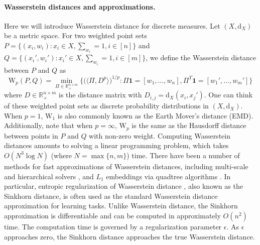 \documentclass[12pt]{article}
\newcommand{\R}{\mathbb R}
\begin{document}
\paragraph{Wasserstein distances and approximations.}
Here we will introduce Wasserstein distance for discrete measures. Let $(X, \mathrm{d}_X)$ be a metric space. 
For two weighted point sets $P = \{(x_i, w_i) : x_i \in X, \sum_{w_i} = 1, i \in [n]\}$ and $Q = \{(x_i', w_i'): x_i' \in X, \sum_{w_i} = 1, i \in [m]\}$, we define the Wasserstein distance between $P$ and $Q$ as 
\begin{equation*}
    \mathrm{W}_p(P, Q) = \min_{\Pi \in \R_+^{n \times m}} \Big\{\Big(\langle \Pi, D^p\rangle\Big)^{1/p} : \Pi \mathbf{1} = [w_1, \dots, w_n], \Pi^T \mathbf{1} = [w_1', \dots, w_m'] \Big\}
\end{equation*}
where $D \in \R_{+}^{n \times m}$ is the distance matrix with $D_{i, j} = \mathrm{d}_X(x_i, x_j')$.
One can think of these weighted point sets as discrete probability distributions in $(X, \mathrm{d}_X)$.
When $p = 1$, $\mathrm{W}_1$ is also commonly known as the Earth Mover's distance (EMD). 
Additionally, note that when $p = \infty$, $\mathrm{W}_p$ is the same as the Hausdorff distance between points in $P$ and $Q$ with non-zero weight. 
Computing Wasserstein distances amounts to solving a linear programming problem, which takes $O(N^3 \log N)$ (where $N = \max\{n, m\}$) time. 
There have been a number of methods for fast approximations of Wasserstein distances, including  multi-scale and hierarchical solvers \citep{schmitzer2016sparse}, and $L_1$ embeddings via quadtree algorithms \citep{backurs2020scalable, IndykThaper2003}. In particular, entropic regularization of Wasserstein distance \citep{cuturi2013sinkhorn}, also known as the Sinkhorn distance, is often used as the standard Wasserstein distance approximation for learning tasks. Unlike Wasserstein distance, the Sinkhorn approximation is differentiable and can be computed in approximately $O(n^2)$ time. 
The computation time is governed by a regularization parameter $\epsilon$. 
As $\epsilon$ approaches zero, the Sinkhorn distance approaches the true Wasserstein distance.
\end{document}
